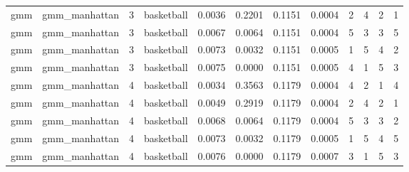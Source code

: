{\begin{longtable}{| p{1cm} | p{1.8cm} | p{0.7cm} | p{0.9cm} | p{0.5cm} | p{0.65cm} | p{0.5cm} | p{0.5cm} | p{0.55cm} | p{0.55cm} | p{0.6cm} | p{0.5cm} |}
\scriptsize     gmm   & \scriptsize    gmm\_manhattan & \scriptsize    3    & \scriptsize basketball & \scriptsize    0.0036  &  \scriptsize 0.2201 & \scriptsize 0.1151 & \scriptsize    0.0004 & \scriptsize   2  & \scriptsize    4  & \scriptsize    2  & \scriptsize    1 \\
\scriptsize     gmm   & \scriptsize    gmm\_manhattan & \scriptsize    3    & \scriptsize basketball & \scriptsize    0.0067  &  \scriptsize 0.0064 & \scriptsize 0.1151 & \scriptsize    0.0004 & \scriptsize   5  & \scriptsize    3  & \scriptsize    3  & \scriptsize    5 \\
\scriptsize     gmm   & \scriptsize    gmm\_manhattan & \scriptsize    3    & \scriptsize basketball & \scriptsize    0.0073  &  \scriptsize 0.0032 & \scriptsize 0.1151 & \scriptsize    0.0005 & \scriptsize   1  & \scriptsize    5  & \scriptsize    4  & \scriptsize    2 \\
\scriptsize     gmm   & \scriptsize    gmm\_manhattan & \scriptsize    3    & \scriptsize basketball & \scriptsize    0.0075  &  \scriptsize 0.0000 & \scriptsize 0.1151 & \scriptsize    0.0005 & \scriptsize   4  & \scriptsize    1  & \scriptsize    5  & \scriptsize    3 \\
\cline{3-12}
\scriptsize     gmm   & \scriptsize    gmm\_manhattan & \scriptsize    4    & \scriptsize basketball & \scriptsize    0.0034  &  \scriptsize 0.3563 & \scriptsize 0.1179 & \scriptsize    0.0004 & \scriptsize   4  & \scriptsize    2  & \scriptsize    1  & \scriptsize    4 \\
\scriptsize     gmm   & \scriptsize    gmm\_manhattan & \scriptsize    4    & \scriptsize basketball & \scriptsize    0.0049  &  \scriptsize 0.2919 & \scriptsize 0.1179 & \scriptsize    0.0004 & \scriptsize   2  & \scriptsize    4  & \scriptsize    2  & \scriptsize    1 \\
\scriptsize     gmm   & \scriptsize    gmm\_manhattan & \scriptsize    4    & \scriptsize basketball & \scriptsize    0.0068  &  \scriptsize 0.0064 & \scriptsize 0.1179 & \scriptsize    0.0004 & \scriptsize   5  & \scriptsize    3  & \scriptsize    3  & \scriptsize    2 \\
\scriptsize     gmm   & \scriptsize    gmm\_manhattan & \scriptsize    4    & \scriptsize basketball & \scriptsize    0.0073  &  \scriptsize 0.0032 & \scriptsize 0.1179 & \scriptsize    0.0005 & \scriptsize   1  & \scriptsize    5  & \scriptsize    4  & \scriptsize    5 \\
\scriptsize     gmm   & \scriptsize    gmm\_manhattan & \scriptsize    4    & \scriptsize basketball & \scriptsize    0.0076  &  \scriptsize 0.0000 & \scriptsize 0.1179 & \scriptsize    0.0007 & \scriptsize   3  & \scriptsize    1  & \scriptsize    5  & \scriptsize    3 \\

\end{longtable}}
